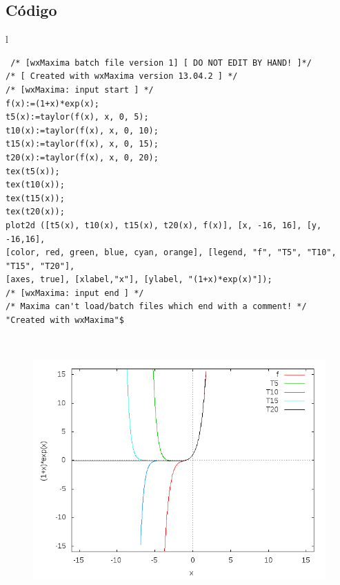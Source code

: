 \documentclass[10pt]{article}
\begin{document}
\subsection{Código}
\begin{tabular}{l}
\begin{verbatim}  
 /* [wxMaxima batch file version 1] [ DO NOT EDIT BY HAND! ]*/
/* [ Created with wxMaxima version 13.04.2 ] */
/* [wxMaxima: input start ] */
f(x):=(1+x)*exp(x);
t5(x):=taylor(f(x), x, 0, 5);
t10(x):=taylor(f(x), x, 0, 10);
t15(x):=taylor(f(x), x, 0, 15);
t20(x):=taylor(f(x), x, 0, 20);
tex(t5(x));
tex(t10(x));
tex(t15(x));
tex(t20(x));
plot2d ([t5(x), t10(x), t15(x), t20(x), f(x)], [x, -16, 16], [y, -16,16],
[color, red, green, blue, cyan, orange], [legend, "f", "T5", "T10", "T15", "T20"],
[axes, true], [xlabel,"x"], [ylabel, "(1+x)*exp(x)"]);
/* [wxMaxima: input end ] */
/* Maxima can't load/batch files which end with a comment! */
"Created with wxMaxima"$ 
\end{verbatim} \\
\begin{figure}
  \centering
    \includegraphics[scale=0.4]{1xexp}
\end{figure}
\end{tabular}


\end{document}
